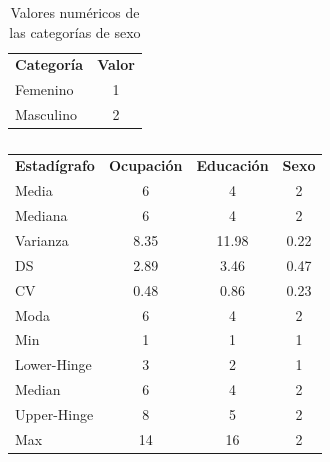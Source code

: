 \documentclass[10pt,twocolumn,a4paper]{article}
\begin{document}
\begin{table}[h!]
  \begin{center}
	  \caption{Valores num\'ericos de las categorías de sexo  }
    \label{tab:table3}
    \begin{tabular}{|l|c|} 
		\textbf{Categor\'ia} & \textbf{Valor} \\
		  Femenino      &1 \\
		  Masculino      &2 \\
           \hline
    \end{tabular}
  \end{center}
\end{table}

\begin{table}[h!]
  \begin{center}
    \caption{}
    \label{tab:table4}
    \begin{tabular}{|l|c|c|c|} 
		\textbf{Estad\'igrafo} & \textbf{Ocupaci\'on} & \textbf{Educaci\'on} &\textbf{Sexo }\\
    Media &  6& 4  &2   \\
    Mediana & 6 &4  &2  \\
    Varianza & 8.35 & 11.98 &  0.22\\
    DS &2.89  & 3.46 & 0.47  \\
	CV &  0.48& 0.86 &0.23 \\
    Moda & 6  & 4 & 2 \\
	Min &1 &1 &1 \\ 
	Lower-Hinge &3 &2 &1 \\ 
	Median &6 &4 &2 \\ 
	Upper-Hinge &8 &5 &2 \\ 
	Max & 14&16 &2 \\ 
      \hline
    \end{tabular}
  \end{center}
\end{table}
\end{document}
